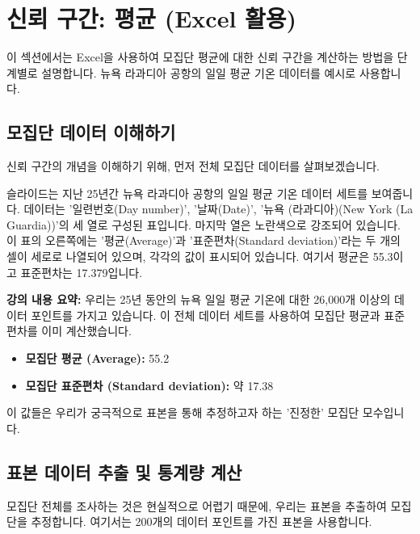 \documentclass[11pt,a4paper]{article}
\begin{document}
\newpage
\section{신뢰 구간: 평균 (Excel 활용)}

이 섹션에서는 Excel을 사용하여 모집단 평균에 대한 신뢰 구간을 계산하는 방법을 단계별로 설명합니다. 뉴욕 라과디아 공항의 일일 평균 기온 데이터를 예시로 사용합니다.

\subsection{모집단 데이터 이해하기}

신뢰 구간의 개념을 이해하기 위해, 먼저 전체 모집단 데이터를 살펴보겠습니다.

\begin{tcolorbox}[title=슬라이드 38: 뉴욕 일일 기온 샘플 Excel 시트 (1/22)]
슬라이드는 지난 25년간 뉴욕 라과디아 공항의 일일 평균 기온 데이터 세트를 보여줍니다. 데이터는 '일련번호(Day number)', '날짜(Date)', '뉴욕 (라과디아)(New York (La Guardia))'의 세 열로 구성된 표입니다. 마지막 열은 노란색으로 강조되어 있습니다. 이 표의 오른쪽에는 '평균(Average)'과 '표준편차(Standard deviation)'라는 두 개의 셀이 세로로 나열되어 있으며, 각각의 값이 표시되어 있습니다. 여기서 평균은 55.3이고 표준편차는 17.379입니다.
\end{tcolorbox}

\textbf{강의 내용 요약:}
우리는 25년 동안의 뉴욕 일일 평균 기온에 대한 26,000개 이상의 데이터 포인트를 가지고 있습니다. 이 전체 데이터 세트를 사용하여 모집단 평균과 표준편차를 이미 계산했습니다.
\begin{itemize}
    \item \textbf{모집단 평균 (Average):} 55.2
    \item \textbf{모집단 표준편차 (Standard deviation):} 약 17.38
\end{itemize}
이 값들은 우리가 궁극적으로 표본을 통해 추정하고자 하는 '진정한' 모집단 모수입니다.

\subsection{표본 데이터 추출 및 통계량 계산}

모집단 전체를 조사하는 것은 현실적으로 어렵기 때문에, 우리는 표본을 추출하여 모집단을 추정합니다. 여기서는 200개의 데이터 포인트를 가진 표본을 사용합니다.
\end{document}

